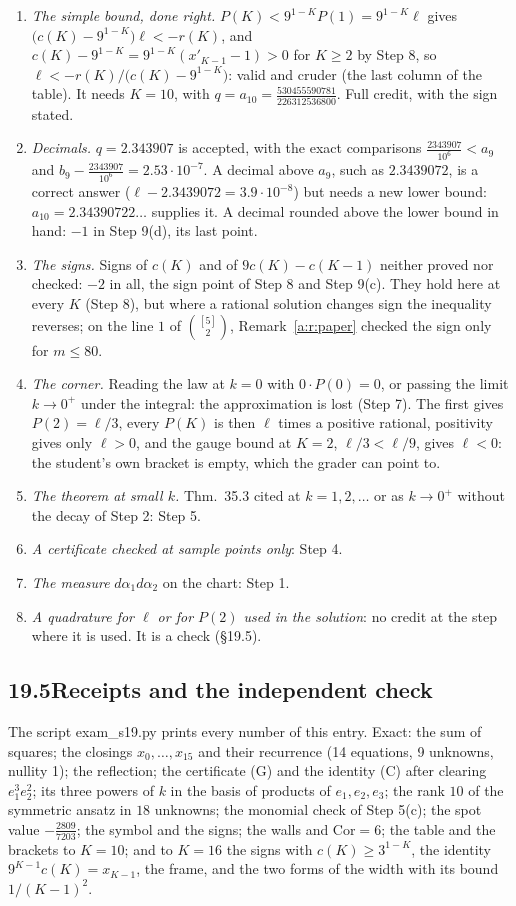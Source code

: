 \documentclass[11pt]{article}
\theoremstyle{plain}
\theoremstyle{definition}
\theoremstyle{remark}
\begin{document}
\begin{enumerate}[label=\arabic*.]
\item \emph{The simple bound, done right.} $P(K)<9^{1-K}P(1)=9^{1-K}\ell$ gives $\big(c(K)-9^{1-K}\big)\ell<-r(K)$, and $c(K)-9^{1-K}=9^{1-K}(x'_{K-1}-1)>0$ for $K\ge2$ by Step 8, so $\ell<-r(K)/\big(c(K)-9^{1-K}\big)$: valid and cruder (the last column of the table). It needs $K=10$, with $q=a_{10}=\frac{530455590781}{226312536800}$. Full credit, with the sign stated.
\item \emph{Decimals.} $q=2.343907$ is accepted, with the exact comparisons $\frac{2343907}{10^6}<a_9$ and $b_9-\frac{2343907}{10^6}=2.53\cdot10^{-7}$. A decimal above $a_9$, such as $2.3439072$, is a correct answer ($\ell-2.3439072=3.9\cdot10^{-8}$) but needs a new lower bound: $a_{10}=2.34390722\ldots$ supplies it. A decimal rounded above the lower bound in hand: $-1$ in Step 9(d), its last point.
\item \emph{The signs.} Signs of $c(K)$ and of $9c(K)-c(K-1)$ neither proved nor checked: $-2$ in all, the sign point of Step 8 and Step 9(c). They hold here at every $K$ (Step 8), but where a rational solution changes sign the inequality reverses; on the line $1$ of $\binom{[5]}2$, Remark~\ref{a:r:paper} checked the sign only for $m\le80$.
\item \emph{The corner.} Reading the law at $k=0$ with $0\cdot P(0)=0$, or passing the limit $k\to0^+$ under the integral: the approximation is lost (Step 7). The first gives $P(2)=\ell/3$, every $P(K)$ is then $\ell$ times a positive rational, positivity gives only $\ell>0$, and the gauge bound at $K=2$, $\ell/3<\ell/9$, gives $\ell<0$: the student's own bracket is empty, which the grader can point to.
\item \emph{The theorem at small $k$.} Thm.~35.3 cited at $k=1,2,\dots$ or as $k\to0^+$ without the decay of Step 2: Step 5.
\item \emph{A certificate checked at sample points only}: Step 4.
\item \emph{The measure} $d\alpha_1d\alpha_2$ on the chart: Step 1.
\item \emph{A quadrature for $\ell$ or for $P(2)$ used in the solution}: no credit at the step where it is used. It is a check (\S19.5).
\end{enumerate}

\subsection*{19.5\quad Receipts and the independent check}

The script exam\_s19.py prints every number of this entry. Exact: the sum of squares; the closings $x_0,\dots,x_{15}$ and their recurrence (14 equations, 9 unknowns, nullity 1); the reflection; the certificate (G) and the identity (C) after clearing $e_1^3e_2^2$; its three powers of $k$ in the basis of products of $e_1,e_2,e_3$; the rank $10$ of the symmetric ansatz in $18$ unknowns; the monomial check of Step 5(c); the spot value $-\frac{2809}{7203}$; the symbol and the signs; the walls and $\mathrm{Cor}=6$; the table and the brackets to $K=10$; and to $K=16$ the signs with $c(K)\ge3^{1-K}$, the identity $9^{K-1}c(K)=x_{K-1}$, the frame, and the two forms of the width with its bound $1/(K-1)^2$.
\end{document}
